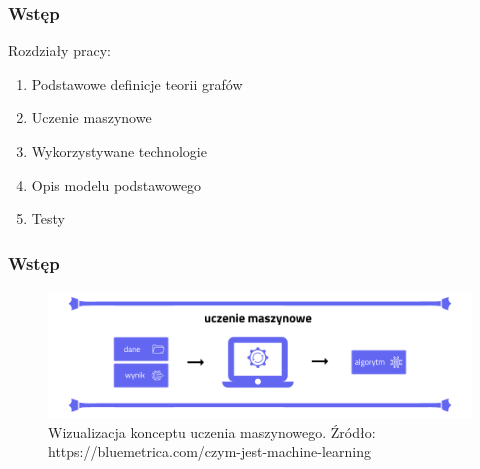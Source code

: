 \begin{frame}
    \frametitle{Wstęp}

    Rozdziały pracy:
    \begin{enumerate}
        \item Podstawowe definicje teorii grafów
        \item Uczenie maszynowe
        \item Wykorzystywane technologie
        \item Opis modelu podstawowego
        \item Testy
    \end{enumerate}

\end{frame}

\begin{frame}
    \frametitle{Wstęp}

    \begin{figure}[ht]
        \centering
        \includegraphics[width=\textwidth]{resources/img/przerywnik-machine-learning.png}
        \caption{Wizualizacja konceptu uczenia maszynowego.
		    Źródło: https://bluemetrica.com/czym-jest-machine-learning}
    \end{figure}

\end{frame}